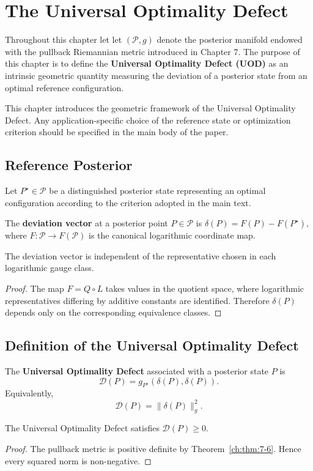 \chapter[Universal Optimality Defect]{The Universal Optimality Defect}
Throughout this chapter let let $(\mathcal P,g)$ denote the posterior manifold endowed with the pullback Riemannian metric introduced in Chapter 7.
The purpose of this chapter is to define the \textbf{Universal Optimality Defect (UOD)} as an intrinsic geometric quantity measuring the deviation of a posterior state from an optimal reference configuration.
\begin{remark}
This chapter introduces the geometric framework of the Universal Optimality Defect. Any application-specific choice of the reference state or optimization criterion should be specified in the main body of the paper.
\end{remark}
\section{Reference Posterior}
Let $P^\star\in\mathcal P$ be a distinguished posterior state representing an optimal configuration according to the criterion adopted in the main text.
\begin{definition}
\label{ch:def:8-1}
The \textbf{deviation vector} at a posterior point
$P\in\mathcal P$
is
$\delta(P)=F(P)-F(P^\star),$
where
$F:\mathcal P\rightarrow F(\mathcal P)$
is the canonical logarithmic coordinate map.
\end{definition}
\begin{proposition}
\label{ch:prop:8-2}
The deviation vector is independent of the representative chosen in each logarithmic gauge class.
\end{proposition}
\begin{proof}
The map
$F=Q\circ L$
takes values in the quotient space, where logarithmic representatives differing by additive constants are identified.
Therefore
$\delta(P)$
depends only on the corresponding equivalence classes. 
\end{proof}
\section{Definition of the Universal Optimality Defect}
\begin{definition}
\label{ch:def:8-3}
The \textbf{Universal Optimality Defect} associated with a posterior state
$P$
is
\[
\mathcal D(P)
=
g_{P^\star}\!\left(
\delta(P),
\delta(P)
\right).
\]
Equivalently,
\[
\mathcal D(P)
=
\|\delta(P)\|_{g}^{2}.
\]
\end{definition}
\begin{proposition}
\label{ch:prop:8-4}
The Universal Optimality Defect satisfies
$\mathcal D(P)\ge0.$
\end{proposition}
\begin{proof}
The pullback metric is positive definite by Theorem~\ref{ch:thm:7-6}.
Hence every squared norm is non-negative. 
\end{proof}

